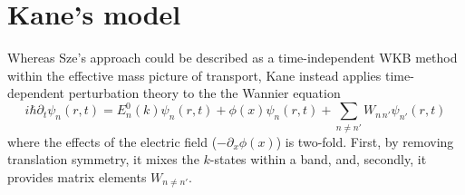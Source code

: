 \section{Kane's model}
Whereas Sze's approach could be described as a time-independent WKB method within the effective mass picture of transport, Kane instead applies time-dependent perturbation theory to the the Wannier equation
$$i\hbar\partial_t\psi_n(r,t)=E_n^0(k)\psi_n(r,t)+\phi(x)\psi_n(r,t)+\sum_{n\neq n'} W_{n\,n'}\psi_{n'}(r,t)$$
where the effects of the electric field ($-\partial_x\phi(x)$) is two-fold.  First, by removing translation symmetry, it mixes the $k$-states within a band, and, secondly, it provides matrix elements $W_{n\neq n'}$.